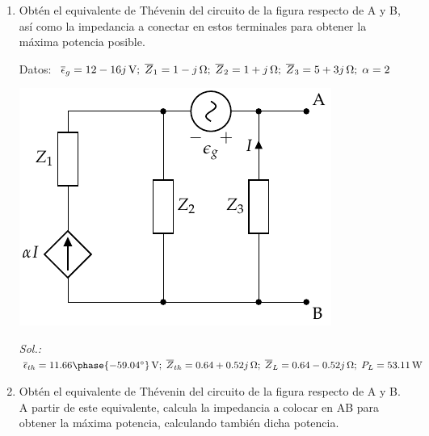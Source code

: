 \begin{enumerate}
\item   Obtén el equivalente de Thévenin del circuito de la figura
  respecto de A y B, así como la impedancia a conectar en estos terminales para obtener la máxima potencia posible.

Datos: $\; \overline{\epsilon}_g = \qty[parse-numbers=false]{12 - 16j}{\volt};\;
  \overline{Z}_1 = \qty[parse-numbers=false]{1 - j}{\ohm};\;
  \overline{Z}_2 = \qty[parse-numbers=false]{1 + j}{\ohm};\;
  \overline{Z}_3 = \qty[parse-numbers=false]{5 + 3j}{\ohm};\;
  \alpha = 2 $
  
\begin{center}
  \includegraphics{../figs/Thevenin4}
\end{center}

\emph{Sol.:\;
  $ \overline{\epsilon}_{th} = 11.66\phase{\ang{-59.04}}\,\si{\volt};\;
  \overline{Z}_{th} = 0.64 + 0.52j\,\si{\ohm};\; \overline{Z}_L = 0.64-0.52j\,\si{\ohm};\; P_L = \qty{53.11}{\watt}$}

\item Obtén el equivalente de Thévenin del circuito de la figura respecto de A y B. A partir de este equivalente, calcula la impedancia a colocar en AB para obtener la máxima potencia, calculando también dicha potencia.


\end{enumerate}
